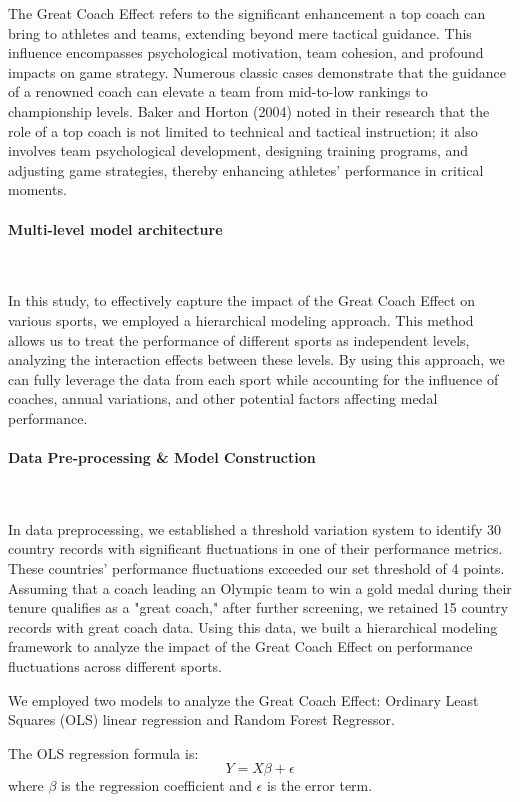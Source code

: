 \documentclass[12pt]{article}
\begin{document}
The Great Coach Effect refers to the significant enhancement a top coach can bring to athletes and teams, extending beyond mere tactical guidance. This influence encompasses psychological motivation, team cohesion, and profound impacts on game strategy. Numerous classic cases demonstrate that the guidance of a renowned coach can elevate a team from mid-to-low rankings to championship levels. Baker and Horton (2004) noted in their research that the role of a top coach is not limited to technical and tactical instruction; it also involves team psychological development, designing training programs, and adjusting game strategies, thereby enhancing athletes' performance in critical moments.

\paragraph{Multi-level model architecture} \

In this study, to effectively capture the impact of the Great Coach Effect on various sports, we employed a hierarchical modeling approach. This method allows us to treat the performance of different sports as independent levels, analyzing the interaction effects between these levels. By using this approach, we can fully leverage the data from each sport while accounting for the influence of coaches, annual variations, and other potential factors affecting medal performance.

\paragraph{Data Pre-processing \& Model Construction} \

In data preprocessing, we established a threshold variation system to identify 30 country records with significant fluctuations in one of their performance metrics. These countries' performance fluctuations exceeded our set threshold of 4 points. Assuming that a coach leading an Olympic team to win a gold medal during their tenure qualifies as a "great coach," after further screening, we retained 15 country records with great coach data. Using this data, we built a hierarchical modeling framework to analyze the impact of the Great Coach Effect on performance fluctuations across different sports.

We employed two models to analyze the Great Coach Effect: Ordinary Least Squares (OLS) linear regression and Random Forest Regressor.

The OLS regression formula is:
$$
Y = X\beta + \epsilon
$$
where $\beta$ is the regression coefficient and $\epsilon$ is the error term.
\end{document}
